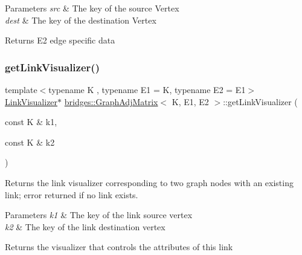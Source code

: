 \begin{DoxyParams}{Parameters}
{\em src} & The key of the source Vertex \\
\hline
{\em dest} & The key of the destination Vertex\\
\hline
\end{DoxyParams}
\begin{DoxyReturn}{Returns}
E2 edge specific data 
\end{DoxyReturn}
\mbox{\label{classbridges_1_1_graph_adj_matrix_a52652abff91b98257e17aea6f9560128}} 
\subsubsection{\texorpdfstring{get\+Link\+Visualizer()}{getLinkVisualizer()}}
{\footnotesize\ttfamily template$<$typename K , typename E1  = K, typename E2  = E1$>$ \\
\mbox{\hyperlink{classbridges_1_1_link_visualizer}{Link\+Visualizer}}$\ast$ \mbox{\hyperlink{classbridges_1_1_graph_adj_matrix}{bridges\+::\+Graph\+Adj\+Matrix}}$<$ K, E1, E2 $>$\+::get\+Link\+Visualizer (\begin{DoxyParamCaption}\item[{const K \&}]{k1,  }\item[{const K \&}]{k2 }\end{DoxyParamCaption})\hspace{0.3cm}{\ttfamily [inline]}}

Returns the link visualizer corresponding to two graph nodes with an existing link; error returned if no link exists.


\begin{DoxyParams}{Parameters}
{\em k1} & The key of the link source vertex \\
\hline
{\em k2} & The key of the link destination vertex\\
\hline
\end{DoxyParams}
\begin{DoxyReturn}{Returns}
the visualizer that controls the attributes of this link 
\end{DoxyReturn}
\mbox{\label{classbridges_1_1_graph_adj_matrix_aef5c14842d7b8b83037dc63bfd447259}} 
